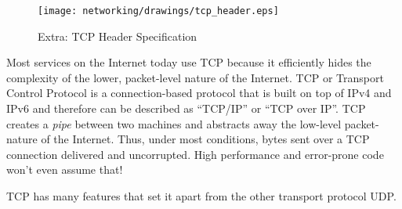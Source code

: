 \begin{figure}[H]
  \centering
\texttt{[image: networking/drawings/tcp\_header.eps]}
\caption{Extra: TCP Header Specification}
\end{figure}

Most services on the Internet today use TCP because it efficiently hides the complexity of the lower, packet-level nature of the Internet.
TCP or Transport Control Protocol is a connection-based protocol that is built on top of IPv4 and IPv6 and therefore can be described as ``TCP/IP'' or ``TCP over IP''.
TCP creates a \emph{pipe} between two machines and abstracts away the low-level packet-nature of the Internet. Thus, under most conditions, bytes sent over a TCP connection delivered and uncorrupted.
High performance and error-prone code won't even assume that!

TCP has many features that set it apart from the other transport protocol UDP.

